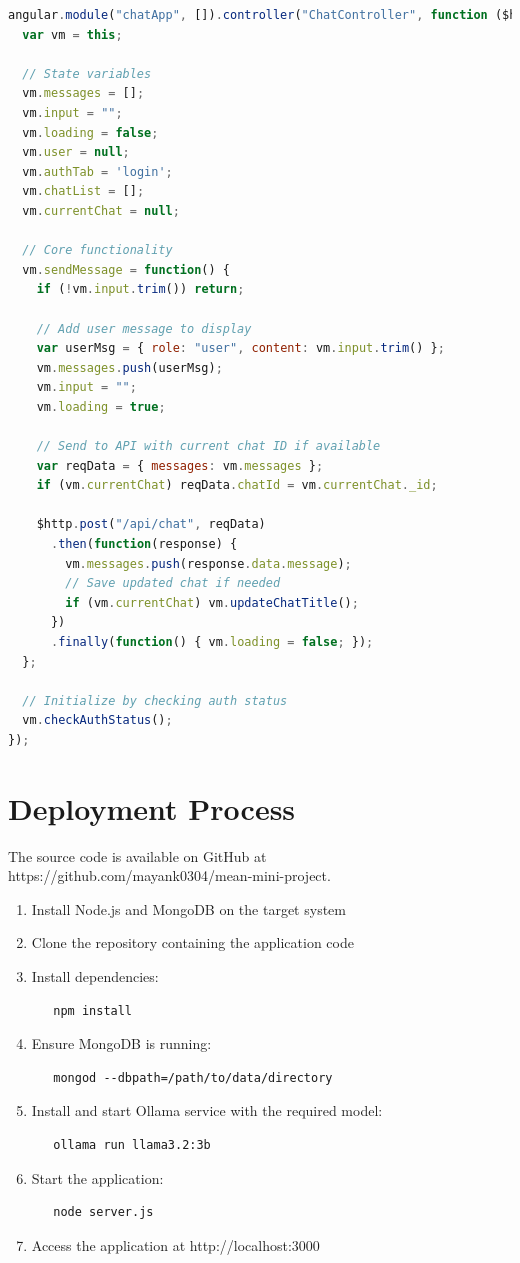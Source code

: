 \documentclass[12pt,a4paper]{article}
\begin{document}
\begin{lstlisting}[language=JavaScript]
angular.module("chatApp", []).controller("ChatController", function ($http) {
  var vm = this;

  // State variables
  vm.messages = [];
  vm.input = "";
  vm.loading = false;
  vm.user = null;
  vm.authTab = 'login';
  vm.chatList = [];
  vm.currentChat = null;

  // Core functionality
  vm.sendMessage = function() {
    if (!vm.input.trim()) return;

    // Add user message to display
    var userMsg = { role: "user", content: vm.input.trim() };
    vm.messages.push(userMsg);
    vm.input = "";
    vm.loading = true;

    // Send to API with current chat ID if available
    var reqData = { messages: vm.messages };
    if (vm.currentChat) reqData.chatId = vm.currentChat._id;

    $http.post("/api/chat", reqData)
      .then(function(response) {
        vm.messages.push(response.data.message);
        // Save updated chat if needed
        if (vm.currentChat) vm.updateChatTitle();
      })
      .finally(function() { vm.loading = false; });
  };

  // Initialize by checking auth status
  vm.checkAuthStatus();
});
\end{lstlisting}

\section{Deployment Process}
The source code is available on GitHub at https://github.com/mayank0304/mean-mini-project.

\begin{enumerate}
\item Install Node.js and MongoDB on the target system
\item Clone the repository containing the application code
\item Install dependencies:
   \begin{verbatim}
   npm install
   \end{verbatim}
\item Ensure MongoDB is running:
   \begin{verbatim}
   mongod --dbpath=/path/to/data/directory
   \end{verbatim}
\item Install and start Ollama service with the required model:
   \begin{verbatim}
   ollama run llama3.2:3b
   \end{verbatim}
\item Start the application:
   \begin{verbatim}
   node server.js
   \end{verbatim}
\item Access the application at http://localhost:3000
\end{enumerate}
\end{document}
